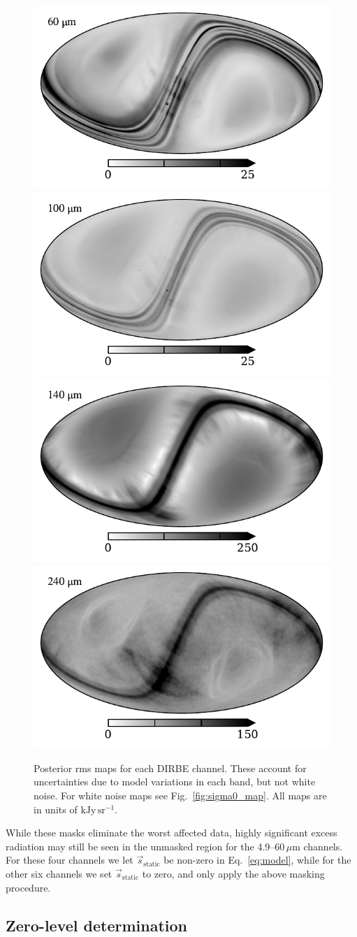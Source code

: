 \documentclass{aa}
\newcommand{\s}[0]{\vec{s}}
\begin{document}
\begin{figure}
  \includegraphics[width=0.37\linewidth]{figs/std_07.pdf}
  \includegraphics[width=0.37\linewidth]{figs/std_08.pdf}\\       
  \includegraphics[width=0.37\linewidth]{figs/std_09.pdf}
  \includegraphics[width=0.37\linewidth]{figs/std_10.pdf}       
  \caption{Posterior rms maps for each DIRBE channel. These account
    for uncertainties due to model variations in each band, but not
    white noise. For white noise maps see Fig.~\ref{fig:sigma0_map}.
	All maps are in units of $\mathrm{kJy\,sr^{-1}}$.}
  \label{fig:rms}
\end{figure}


%


While these masks eliminate the worst affected data,
highly significant excess radiation may still be seen in the unmasked
region for the 4.9--60$\,\mu$m channels. For these four channels we
let $\s_{\mathrm{static}}$ be non-zero in Eq.~\eqref{eq:model}, while
for the other six channels we set $\s_{\mathrm{static}}$ to zero, and
only apply the above masking procedure.

\subsection{Zero-level determination}
\end{document}
